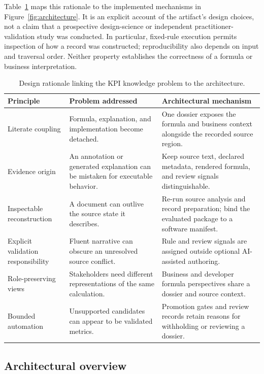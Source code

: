 \documentclass[a4paper,fleqn]{cas-dc}
\begin{document}
Table~\ref{tab:principles} maps this rationale to the implemented mechanisms in Figure~\ref{fig:architecture}. It is an explicit account of the artifact's design choices, not a claim that a prospective design-science or independent practitioner-validation study was conducted. In particular, fixed-rule execution permits inspection of how a record was constructed; reproducibility also depends on input and traversal order. Neither property establishes the correctness of a formula or business interpretation.

\begin{table}[!t]
\centering
\caption{Design rationale linking the KPI knowledge problem to the architecture.}
\label{tab:principles}
\begin{tabularx}{\textwidth}{p{}XX}
\toprule
\textbf{Principle} & \textbf{Problem addressed} & \textbf{Architectural mechanism} \\
\midrule
Literate coupling & Formula, explanation, and implementation become detached. & One dossier exposes the formula and business context alongside the recorded source region. \\
Evidence origin & An annotation or generated explanation can be mistaken for executable behavior. & Keep source text, declared metadata, rendered formula, and review signals distinguishable. \\
Inspectable reconstruction & A document can outlive the source state it describes. & Re-run source analysis and record preparation; bind the evaluated package to a software manifest. \\
Explicit validation responsibility & Fluent narrative can obscure an unresolved source conflict. & Rule and review signals are assigned outside optional AI-assisted authoring. \\
Role-preserving views & Stakeholders need different representations of the same calculation. & Business and developer formula perspectives share a dossier and source context. \\
Bounded automation & Unsupported candidates can appear to be validated metrics. & Promotion gates and review records retain reasons for withholding or reviewing a dossier. \\
\bottomrule
\end{tabularx}
\end{table}

\subsection{Architectural overview}
\end{document}
